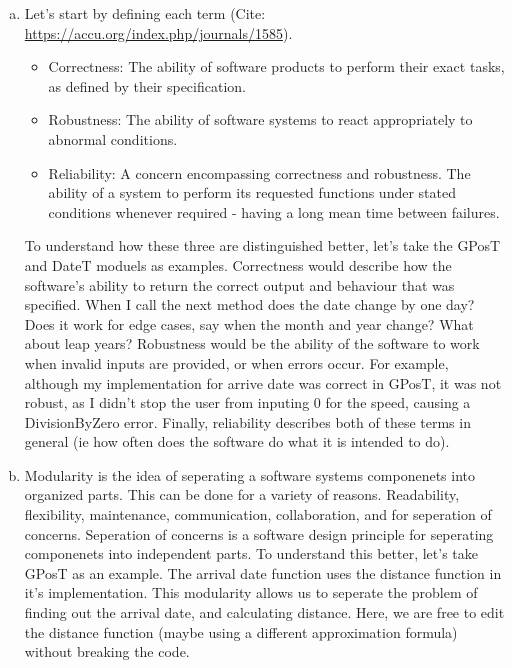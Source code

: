 \documentclass[12pt]{article}
\begin{document}
\begin{enumerate}[(a)]
\item Let's start by defining each term (Cite: \url{https://accu.org/index.php/journals/1585}).
\begin{itemize}
  \item Correctness: The ability of software products to perform their exact tasks, as defined by their specification.
  \item Robustness: The ability of software systems to react appropriately to abnormal conditions.
  \item Reliability: A concern encompassing correctness and robustness. The ability of a system to perform its requested functions under stated conditions whenever required - having a long mean time between failures.
\end{itemize}
To understand how these three are distinguished better, let's take the GPosT and DateT moduels as examples. Correctness would describe how the software's ability to return the correct output and behaviour that was specified. When I call the next method does the date change by one day? Does it work for edge cases, say when the month and year change? What about leap years? Robustness would be the ability of the software to work when invalid inputs are provided, or when errors occur. For example, although my implementation for arrive date was correct in GPosT, it was not robust, as I didn't stop the user from inputing 0 for the speed, causing a DivisionByZero error. Finally, reliability describes both of these terms in general (ie how often does the software do what it is intended to do).

\item Modularity is the idea of seperating a software systems componenets into organized parts. This can be done for a variety of reasons. Readability, flexibility, maintenance, communication, collaboration, and for seperation of concerns. Seperation of concerns is a software design principle for seperating componenets into independent parts. To understand this better, let's take GPosT as an example. The arrival date function uses the distance function in it's implementation. This modularity allows us to seperate the problem of finding out the arrival date, and calculating distance. Here, we are free to edit the distance function (maybe using a different approximation formula) without breaking the code.


\end{enumerate}

\newpage

\lstset{language=Python, basicstyle=\tiny, breaklines=true, showspaces=false,
  showstringspaces=false, breakatwhitespace=true}
\end{document}
